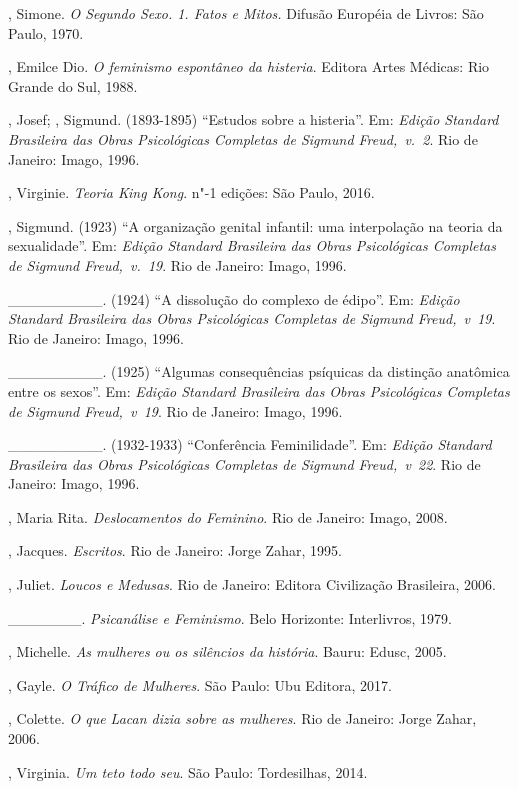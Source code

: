\begin{Parskip}
, Simone. \emph{O Segundo Sexo. 1. Fatos e Mitos.} Difusão
Européia de Livros: São Paulo, 1970.

, Emilce Dio. \emph{O feminismo espontâneo da histeria}.
Editora Artes Médicas: Rio Grande do Sul, 1988.

, Josef; , Sigmund. (1893-1895) ``Estudos sobre a histeria''. Em:
\emph{Edição Standard Brasileira das Obras Psicológicas Completas de Sigmund
Freud,~v.~2}. Rio de Janeiro: Imago, 1996.

, Virginie. \emph{Teoria King Kong}. n"-1 edições: São Paulo, 2016.

, Sigmund. (1923) ``A organização genital infantil: uma interpolação
na teoria da sexualidade''. Em: \emph{Edição Standard Brasileira das Obras
Psicológicas Completas de Sigmund Freud,~v.~19}. Rio de Janeiro: Imago, 1996.

\_\_\_\_\_\_\_\_\_. (1924) ``A dissolução do complexo de édipo''. Em:
\emph{Edição Standard Brasileira das Obras Psicológicas Completas de Sigmund
Freud,~v~19}. Rio de Janeiro: Imago, 1996.

\_\_\_\_\_\_\_\_\_. (1925) ``Algumas consequências psíquicas da
distinção anatômica entre os sexos''. Em: \emph{Edição Standard Brasileira das
Obras Psicológicas Completas de Sigmund Freud,~v~19}. Rio de Janeiro: Imago, 1996.

\_\_\_\_\_\_\_\_\_. (1932-1933) ``Conferência  Feminilidade''.
Em: \emph{Edição Standard Brasileira das Obras Psicológicas Completas de
Sigmund Freud,~v~22}. Rio de Janeiro: Imago, 1996.

, Maria Rita. \emph{Deslocamentos do Feminino}. Rio de Janeiro: Imago, 2008.

, Jacques. \emph{Escritos}. Rio de Janeiro: Jorge Zahar, 1995.

, Juliet. \emph{Loucos e Medusas}. Rio de Janeiro: Editora Civilização
Brasileira, 2006.

\_\_\_\_\_\_\_. \emph{Psicanálise e Feminismo}. Belo Horizonte: Interlivros, 1979.

, Michelle. \emph{As mulheres ou os silêncios da história}. Bauru:
Edusc, 2005.

, Gayle. \emph{O Tráfico de Mulheres}. São Paulo: Ubu Editora, 2017.

, Colette. \emph{O que Lacan dizia sobre as mulheres}. Rio de Janeiro: Jorge Zahar, 2006.

, Virginia. \emph{Um teto todo seu}. São Paulo: Tordesilhas, 2014.
\end{Parskip}


